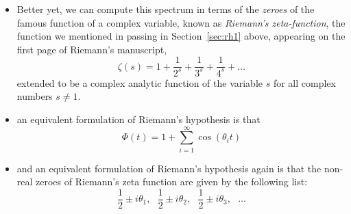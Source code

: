\documentclass[11pt]{article}
\theoremstyle{plain}
\theoremstyle{definition}
\numberwithin{equation}{section}
\numberwithin{figure}{section}
\numberwithin{table}{section}
\begin{document}
\begin{itemize}
$14.134725141734693790457251983562470270784257115699243175685567460149\newline
9634298092567649490103931715610127792029715487974367661426914698822545\newline
8250536323944713778041338123720597054962195586586020055556672583601077\newline
3700205410982661507542780517442591306254481978651072304938725629738321\newline
5774203952157256748093321400349904680343462673144209203773854871413783\newline
1735639699536542811307968053149168852906782082298049264338666734623320\newline
0787587617920056048680543568014444246510655975686659032286865105448594\newline
4432062407272703209427452221304874872092412385141835146054279015244783\newline
3835425453344004487936806761697300819000731393854983736215013045167269\newline
6838920039176285123212854220523969133425832275335164060169763527563758\newline
9695376749203361272092599917304270756830879511844534891800863008264831\newline
2516911271068291052375961797743181517071354531677549515382893784903647\newline
4709727019948485532209253574357909226125247736595518016975233461213977\newline
3160053541259267474557258778014726098308089786007125320875093959979666\newline
60675378381214891908864977277554420656532052405$

\vskip20pt
\noindent and if, by any chance, you wish to peruse the first
$100,\!000$ of these $\theta_i$'s lovingly calculated to an accuracy
within $3\cdot 10^{-9}$, consult Andrew Odlyzko's tables:
\url{http://www.dtc.umn.edu/~odlyzko/zeta_tables}

\item Better yet, we can compute this spectrum in terms of the {\it
    zeroes} of the famous function of a complex variable, known as
  {\it Riemann's zeta-function}, the function we mentioned in passing
  in Section~\ref{sec:rh1} above, appearing on the first page of
  Riemann's manuscript,
  $$
   \zeta(s) = 1 +{\frac{1}{2^s}} +{\frac{1}{3^s}}+{\frac{1}{4^s}}+\dots
  $$
  extended to be a complex analytic function of the variable $s$ for
  all complex numbers $s\ne 1$.

\item an equivalent formulation of Riemann's hypothesis is
  that 
  $$
   \Phi(t) = 1 + \sum_{i=1}^{\infty} \cos(\theta_i t)
  $$ 

 \vskip20pt
 
 \item and an equivalent formulation of Riemann's hypothesis again is
  that the non-real zeroes of Riemann's zeta function are given by the
  following list:
  $${\frac{1}{2}}\pm i\theta_1,\ \ \  
       {\frac{1}{2}}\pm  i\theta_2,\ \ \ 
       {\frac{1}{2}}\pm  i\theta_3,\ \ \  \dots
  $$
\end{itemize}
 
\end{document}
